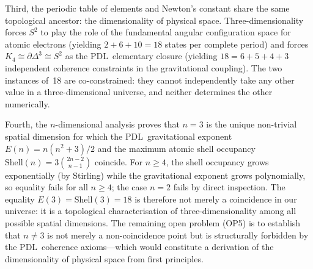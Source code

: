 \documentclass[11pt,a4paper]{article}
\theoremstyle{definition}
\newcommand{\PDL}{\textnormal{PDL}}
\newcommand{\Kfour}{K_4}
\newcommand{\Efun}{E}
\newcommand{\Shell}{\mathrm{Shell}}
\begin{document}
Third, the periodic table of elements and Newton's constant share the same topological ancestor: the dimensionality of physical space. Three-dimensionality forces $S^2$ to play the role of the fundamental angular configuration space for atomic electrons (yielding $2+6+10 = 18$ states per complete period) and forces $\Kfour \cong \partial\Delta^3 \cong S^2$ as the \PDL\ elementary closure (yielding $18 = 6+5+4+3$ independent coherence constraints in the gravitational coupling). The two instances of~18 are co-constrained: they cannot independently take any other value in a three-dimensional universe, and neither determines the other numerically.

Fourth, the $n$-dimensional analysis proves that $n=3$ is the unique non-trivial spatial dimension for which the \PDL\ gravitational exponent $\Efun(n) = n(n^2+3)/2$ and the maximum atomic shell occupancy $\Shell(n) = 3\binom{2n-2}{n-1}$ coincide. For $n \geq 4$, the shell occupancy grows exponentially (by Stirling) while the gravitational exponent grows polynomially, so equality fails for all $n \geq 4$; the case $n=2$ fails by direct inspection. The equality $\Efun(3) = \Shell(3) = 18$ is therefore not merely a coincidence in our universe: it is a topological characterisation of three-dimensionality among all possible spatial dimensions. The remaining open problem (OP5) is to establish that $n \neq 3$ is not merely a non-coincidence point but is structurally forbidden by the \PDL\ coherence axioms---which would constitute a derivation of the dimensionality of physical space from first principles.


\nocite{*}

\end{document}
